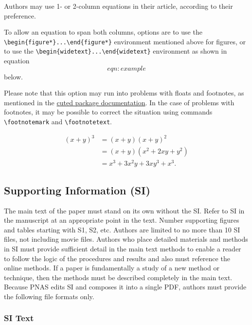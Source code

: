 \documentclass[9pt,twocolumn,twoside,]{pnas-new}
\begin{document}
Authors may use 1- or 2-column equations in their article, according to
their preference.

To allow an equation to span both columns, options are to use the
\texttt{\textbackslash{}begin\{figure*\}...\textbackslash{}end\{figure*\}}
environment mentioned above for figures, or to use the
\texttt{\textbackslash{}begin\{widetext\}...\textbackslash{}end\{widetext\}}
environment as shown in equation \[eqn:example\] below.

Please note that this option may run into problems with floats and
footnotes, as mentioned in the \href{http://texdoc.net/pkg/cuted}{cuted
package documentation}. In the case of problems with footnotes, it may
be possible to correct the situation using commands
\texttt{\textbackslash{}footnotemark} and
\texttt{\textbackslash{}footnotetext}.

\[\begin{aligned}
(x+y)^3&=(x+y)(x+y)^2\\
       &=(x+y)(x^2+2xy+y^2) \label{eqn:example} \\
       &=x^3+3x^2y+3xy^3+x^3. 
\end{aligned}\]

\hypertarget{supporting-information-si}{%
\subsection*{Supporting Information
(SI)}\label{supporting-information-si}}

The main text of the paper must stand on its own without the SI. Refer
to SI in the manuscript at an appropriate point in the text. Number
supporting figures and tables starting with S1, S2, etc. Authors are
limited to no more than 10 SI files, not including movie files. Authors
who place detailed materials and methods in SI must provide sufficient
detail in the main text methods to enable a reader to follow the logic
of the procedures and results and also must reference the online
methods. If a paper is fundamentally a study of a new method or
technique, then the methods must be described completely in the main
text. Because PNAS edits SI and composes it into a single PDF, authors
must provide the following file formats only.

\hypertarget{si-text}{%
\subsubsection*{SI Text}\label{si-text}}
\end{document}
